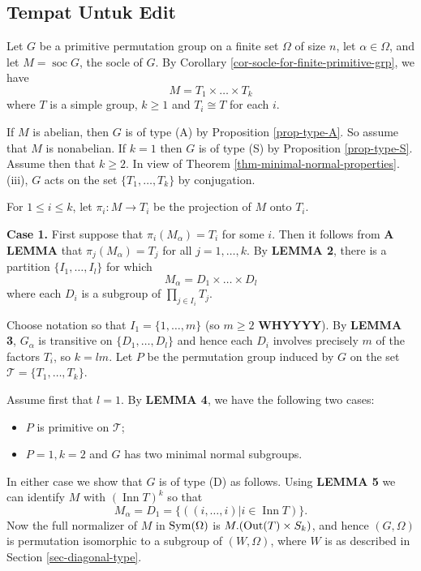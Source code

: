 \clearpage
\subsection{Tempat Untuk Edit}
Let $G$ be a primitive permutation group on a finite set $\Omega$ of size $n$, let $\alpha \in \Omega$, and let $M = \operatorname{soc} G$, the socle of $G$. By Corollary \ref{cor-socle-for-finite-primitive-grp}, we have  
\begin{equation*}
	M =  T_1 \times \dots \times T_k
\end{equation*} where $T$ is a simple group, $k \ge 1$ and $T_i \cong T$ for each $i$. 

If $M$ is abelian, then $G$ is of type (A) by Proposition \ref{prop-type-A}. So assume that $M$ is nonabelian. If $k=1$ then $G$ is of type (S) by Proposition \ref{prop-type-S}. Assume then that $k \ge 2$. In view of Theorem \ref{thm-minimal-normal-properties}.(iii), $G$ acts on the set $\{T_1, \dots, T_k\}$ by conjugation.

For $1 \le i \le k$, let $\pi_i:M\to T_i$ be the projection of $M$ onto $T_i$.

\textbf{Case 1.} First suppose that $\pi_i(M_\alpha) = T_i$ for some $i$. Then it follows from \textbf{A LEMMA} that $\pi_j(M_\alpha) = T_j$ for all $j=1, \dots, k$. By \textbf{LEMMA 2}, there is a partition $\{I_1,\dots, I_l\}$ for which 
\begin{equation*}
	M_\alpha=D_1 \times \dots \times D_l
\end{equation*} where each $D_i$ is a subgroup of $\prod_{j \in I_i} T_j$.


Choose notation so that $I_1 = \{1, \dots, m\}$ (so $m \ge 2$ \textbf{WHYYYY}). By \textbf{LEMMA 3}, $G_\alpha$ is transitive on $\{D_1, \dots, D_l\}$ and hence each $D_i$ involves precisely $m$ of the factors $T_i$, so $k=lm$. Let $P$ be the permutation group induced by $G$ on the set $\mathcal{T} = \{T_1, \dots, T_k\}$. 

Assume first that $l=1$. By \textbf{LEMMA 4}, we have the following two cases:
\begin{itemize}
	\item $P$ is primitive on $\mathcal{T}$;
	\item $P=1, k=2$ and $G$ has two minimal normal subgroups.
\end{itemize} In either case we show that $G$ is of type (D) as follows. Using \textbf{LEMMA 5} we can identify $M$ with $(\operatorname{Inn} T)^k$ so that
$$M_\alpha = D_1 = \{ ((i, \dots, i) | i \in \operatorname{Inn} T) \}. $$ Now the full normalizer of $M$ in $\operatorname{Sym}(\Omega)$ is $M.(\operatorname{Out} (T) \times S_k)$, and hence $(G,\Omega)$ is permutation isomorphic to a subgroup of $(W,\Omega)$, where $W$ is as described in Section \ref{sec-diagonal-type}.


